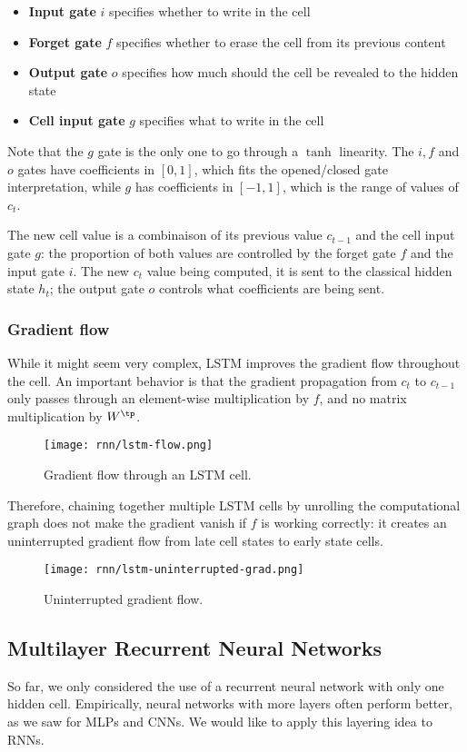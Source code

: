 \begin{itemize}
    \item \textbf{Input gate} $i$ specifies whether to write in the cell
    \item \textbf{Forget gate} $f$ specifies whether to erase the cell from its previous content
    \item \textbf{Output gate} $o$ specifies how much should the cell be revealed to the hidden state
    \item \textbf{Cell input gate} $g$ specifies what to write in the cell
\end{itemize}
Note that the $g$ gate is the only one to go through a $\tanh$ linearity. The $i,f$ and $o$ gates have coefficients in $[0,1]$, which fits the opened/closed gate interpretation, while $g$ has coefficients in $[-1,1]$, which is the range of values of $c_t$.

The new cell value is a combinaison of its previous value $c_{t-1}$ and the cell input gate $g$: the proportion of both values are controlled by the forget gate $f$ and the input gate $i$. The new $c_t$ value being computed, it is sent to the classical hidden state $h_t$; the output gate $o$ controls what coefficients are being sent.

\subsubsection{Gradient flow}
While it might seem very complex, LSTM improves the gradient flow throughout the cell. An important behavior is that the gradient propagation from $c_t$ to $c_{t-1}$ only passes through an element-wise multiplication by $f$, and no matrix multiplication by $W^\tp$.
\begin{figure}[H]
    \centering
    \texttt{[image: rnn/lstm-flow.png]}
    \caption{Gradient flow through an LSTM cell.}
\end{figure}

Therefore, chaining together multiple LSTM cells by unrolling the computational graph does not make the gradient vanish if $f$ is working correctly: it creates an uninterrupted gradient flow from late cell states to early state cells.
\begin{figure}[H]
    \centering
    \texttt{[image: rnn/lstm-uninterrupted-grad.png]}
    \caption{Uninterrupted gradient flow.}
\end{figure}

\subsection{Multilayer Recurrent Neural Networks}
So far, we only considered the use of a recurrent neural network with only one hidden cell. Empirically, neural networks with more layers often perform better, as we saw for MLPs and CNNs. We would like to apply this layering idea to RNNs.

